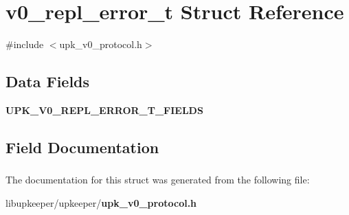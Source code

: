 \section{v0\_\-repl\_\-error\_\-t Struct Reference}
\label{structv0__repl__error__t}


{\ttfamily \#include $<$upk\_\-v0\_\-protocol.h$>$}

\subsection*{Data Fields}
\begin{DoxyCompactItemize}
\item 
{\bf UPK\_\-V0\_\-REPL\_\-ERROR\_\-T\_\-FIELDS}
\end{DoxyCompactItemize}


\subsection{Field Documentation}
\subsubsection[{UPK\_\-V0\_\-REPL\_\-ERROR\_\-T\_\-FIELDS}]{}\label{structv0__repl__error__t_a2f7e3c67fcf7b48a63c8b9eac58fa7f6}


The documentation for this struct was generated from the following file:\begin{DoxyCompactItemize}
\item 
libupkeeper/upkeeper/{\bf upk\_\-v0\_\-protocol.h}\end{DoxyCompactItemize}
